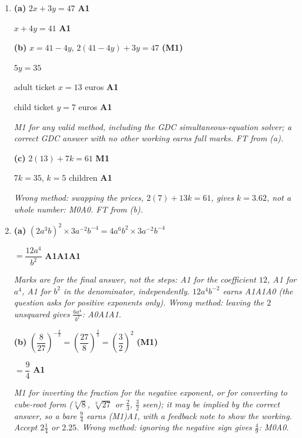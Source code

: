 \documentclass[12pt, twoside]{article}
\begin{document}
\begin{enumerate}[itemsep=0.3cm]
\newpage

\item[2.] [Maximum mark: 7]

\textbf{(a)} $2x + 3y = 47$ \hfill \textbf{A1}

$x + 4y = 41$ \hfill \textbf{A1}

\textbf{(b)} $x = 41 - 4y$, \quad $2(41 - 4y) + 3y = 47$ \hfill \textbf{(M1)}

$5y = 35$

adult ticket $x = 13$ euros \hfill \textbf{A1}

child ticket $y = 7$ euros \hfill \textbf{A1}

\emph{M1 for any valid method, including the GDC simultaneous-equation
solver; a correct GDC answer with no other working earns full marks. FT
from (a).}

\textbf{(c)} $2(13) + 7k = 61$ \hfill \textbf{M1}

$7k = 35$, \quad $k = 5$ children \hfill \textbf{A1}

\emph{Wrong method: swapping the prices, $2(7) + 13k = 61$, gives
$k = 3.62$, not a whole number: M0A0. FT from (b).}

\newpage

\item[3.] [Maximum mark: 10]

\textbf{(a)} $\left(2a^{3}b\right)^{2} \times 3a^{-2}b^{-4} = 4a^{6}b^{2} \times 3a^{-2}b^{-4}$

$= \dfrac{12a^{4}}{b^{2}}$ \hfill \textbf{A1A1A1}

\emph{Marks are for the final answer, not the steps: A1 for the
coefficient $12$, A1 for $a^{4}$, A1 for $b^{2}$ in the denominator,
independently. $12a^{4}b^{-2}$ earns A1A1A0 (the question asks for positive
exponents only). Wrong method: leaving the $2$ unsquared gives
$\frac{6a^{4}}{b^{2}}$: A0A1A1.}

\textbf{(b)} $\left(\dfrac{8}{27}\right)^{-\frac{2}{3}} = \left(\dfrac{27}{8}\right)^{\frac{2}{3}} = \left(\dfrac{3}{2}\right)^{2}$ \hfill \textbf{(M1)}

$= \dfrac{9}{4}$ \hfill \textbf{A1}

\emph{M1 for inverting the fraction for the negative exponent, or for
converting to cube-root form ($\sqrt[3]{8}$, $\sqrt[3]{27}$ or
$\frac{2}{3}$, $\frac{3}{2}$ seen); it may be implied by the correct
answer, so a bare $\frac{9}{4}$ earns (M1)A1, with a feedback note to show the working. Accept $2\frac{1}{4}$ or
$2.25$. Wrong method: ignoring the negative sign gives $\frac{4}{9}$:
M0A0.}


\end{enumerate}
\end{document}
